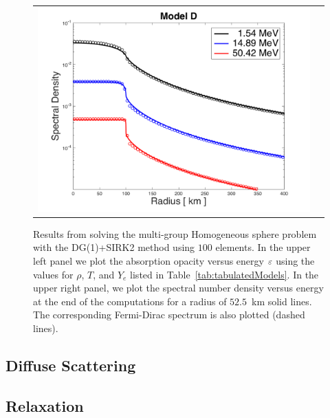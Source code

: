 \documentclass[10pt,preprint]{aastex}
\begin{document}
\begin{figure}
\begin{center}
\begin{tabular}{cc}
      \includegraphics[scale=0.4]{./Figures/HomogeneousSphere_VsRadius_D}
    \end{tabular}
  \end{center}
  \caption{Results from solving the multi-group Homogeneous sphere problem with the DG(1)+SIRK2 method using $100$ elements.
    In the upper left panel we plot the absorption opacity versus energy $\varepsilon$ using the values for $\rho$, $T$, and $Y_{e}$ listed in Table~\ref{tab:tabulatedModels}. In the upper right panel, we plot the spectral number density versus energy at the end of the computations for a radius of $52.5$~km solid lines.  The corresponding Fermi-Dirac spectrum is also plotted (dashed lines).  }
  \label{fig:homogeneousSphere1D_weaklib}
\end{figure}

\subsection{Diffuse Scattering}

\subsection{Relaxation}
\end{document}
